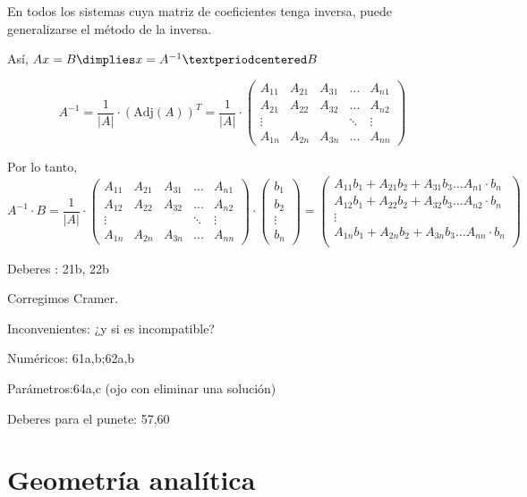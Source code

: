 En todos los sistemas cuya matriz de coeficientes tenga inversa, puede generalizarse el método de la inversa.

Así, $Ax = B \dimplies x = A^{-1}·B$

\[
    A^{-1} = \frac{1}{|A|} · \left( \text{Adj}(A) \right)^T = \frac{1}{|A|} · \begin{pmatrix} 
    A_{11} & A_{21} & A_{31} & ... & A_{n1}\\
    A_{21} & A_{22} & A_{32} & ... & A_{n2}\\
    \vdots &        &       & \ddots & \vdots\\
    A_{1n} & A_{2n} & A_{3n} & ... & A_{nn}\end{pmatrix}
\]

Por lo tanto,
\[
    A^{-1}·B = \frac{1}{|A|} · 
    \begin{pmatrix} 
        A_{11} & A_{21} & A_{31} & ... & A_{n1}\\
        A_{12} & A_{22} & A_{32} & ... & A_{n2}\\
        \vdots &        &       & \ddots & \vdots\\
        A_{1n} & A_{2n} & A_{3n} & ... & A_{nn}\end{pmatrix}·
    \begin{pmatrix}
        b_1\\b_2\\\vdots\\ b_n
    \end{pmatrix}
    = 
    \begin{pmatrix}
    A_{11}b_1 + A_{21}b_2 + A_{31}b_3 \dots A_{n1}·b_n\\
    A_{12}b_1 + A_{22}b_2 + A_{32}b_3 \dots A_{n2}·b_n\\
    \vdots\\
    A_{1n}b_1 + A_{2n}b_2 + A_{3n}b_3 \dots A_{nn}·b_n\\
    \end{pmatrix}
\]

Deberes : 21b, 22b

Corregimos Cramer. 

Inconvenientes: ¿y si es incompatible?

Numéricos: 61a,b;62a,b

Parámetros:64a,c (ojo con eliminar una solución)



Deberes para el punete: 
57,60

\chapter{Geometría analítica}

